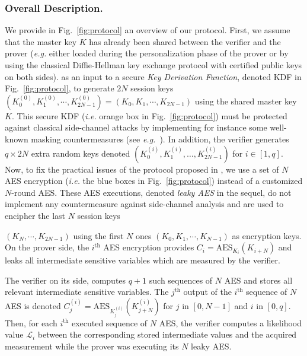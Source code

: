 \subsubsection{Overall Description.}\label{sssec:overall}
We provide in Fig.~\ref{fig:protocol} an overview of our protocol. 
First, we assume that the master key $K$ has already been shared between the verifier and the prover (\emph{e.g.} either loaded during the personalization phase of the prover or by using the classical Diffie-Hellman key exchange protocol with certified public keys on both sides).
 as an input to a secure \textit{Key Derivation Function}, denoted KDF in Fig.~\ref{fig:protocol}, to generate $2N$ session keys $(K_0^{(0)}, K_1^{(0)}, \cdots, K_{2N-1}^{(0)}) = (K_0, K_1, \cdots, K_{2N-1})$ using the shared master key $K$.
This secure KDF (\emph{i.e.} orange box in Fig.~\ref{fig:protocol}) must be protected against classical side-channel attacks by implementing for instance some well-known masking countermeasures (see \emph{e.g.}~\cite{DBLP:conf/eurocrypt/Coron14,DBLP:conf/ches/GenellePQ11,DBLP:conf/ches/RivainP10}). In addition, the verifier generates $q \times 2N$ extra random keys denoted $(K_0^{(i)}, K_1^{(i)}, \dots, K_{2N-1}^{(i)})$ for $i \in [1,q]$. Now, to fix the practical issues of the protocol proposed in \cite{SakiyamaMMKHMMN15}, we use a set of $N$ AES encryption (\emph{i.e.} the 	blue boxes in Fig.~\ref{fig:protocol}) instead of a customized $N$-round AES. 
These AES executions, denoted \textit{leaky AES} in the sequel, do not implement any countermeasure against side-channel analysis and are used to encipher the last $N$ session keys

$(K_N, \cdots, K_{2N-1})$ using the first $N$ ones $(K_0, K_1, \cdots, K_{N-1})$ as encryption keys.\newline
On the prover side, the $i^{\text{th}}$ AES encryption provides $C_i = \mbox{AES}_{K_i}(K_{i+N})$ and leaks all intermediate sensitive variables which are measured by the verifier.

The verifier on its side, computes $q+1$ such sequences of $N$ AES and stores all relevant intermediate sensitive variables. The $j^\text{th}$ output of the $i^\text{th}$ sequence of $N$ AES is denoted $C_j^{(i)} = \mbox{AES}_{K_j^{(i)}}(K_{j+N}^{(i)})$ for $j$ in $[0,N-1]$ and $i$ in $[0,q]$.
Then, for each $i^\text{th}$ executed sequence of $N$ AES, the verifier computes a likelihood value $\mathcal{L}_i$ between the corresponding stored intermediate values and the acquired measurement while the prover was executing its $N$ leaky AES.

